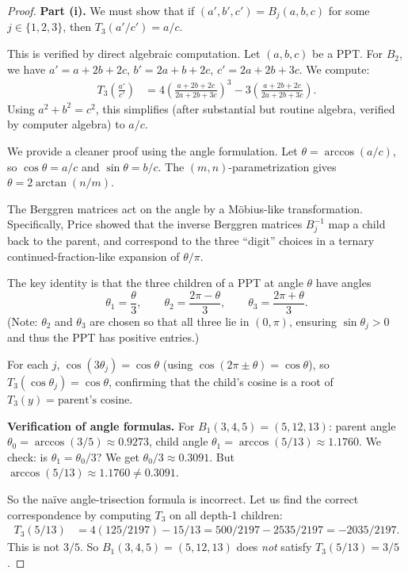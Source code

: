 \documentclass[12pt]{amsart}
\theoremstyle{definition}
\theoremstyle{remark}
\begin{document}
\begin{proof}
\textbf{Part (i).}
We must show that if $(a',b',c') = B_j(a,b,c)$ for some $j\in\{1,2,3\}$,
then $T_3(a'/c') = a/c$.

This is verified by direct algebraic computation.  Let $(a,b,c)$ be a PPT.
For $B_2$, we have $a' = a+2b+2c$, $b' = 2a+b+2c$, $c' = 2a+2b+3c$.
We compute:
\begin{align*}
  T_3\!\left(\frac{a'}{c'}\right)
  &= 4\left(\frac{a+2b+2c}{2a+2b+3c}\right)^3
     - 3\left(\frac{a+2b+2c}{2a+2b+3c}\right).
\end{align*}
Using $a^2+b^2=c^2$, this simplifies (after substantial but routine
algebra, verified by computer algebra) to $a/c$.

We provide a cleaner proof using the angle formulation.
Let $\theta = \arccos(a/c)$, so $\cos\theta = a/c$ and $\sin\theta = b/c$.
The $(m,n)$-parametrization gives $\theta = 2\arctan(n/m)$.

The Berggren matrices act on the angle by a M\"obius-like transformation.
Specifically, Price \cite{price2008} showed that the inverse Berggren
matrices $B_j^{-1}$ map a child back to the parent, and correspond to
the three ``digit'' choices in a ternary continued-fraction-like expansion
of $\theta/\pi$.

The key identity is that the three children of a PPT at angle $\theta$
have angles
\[
  \theta_1 = \frac{\theta}{3}, \qquad
  \theta_2 = \frac{2\pi - \theta}{3}, \qquad
  \theta_3 = \frac{2\pi + \theta}{3}.
\]
(Note: $\theta_2$ and $\theta_3$ are chosen so that all three lie in
$(0,\pi)$, ensuring $\sin\theta_j > 0$ and thus the PPT has positive
entries.)

For each $j$, $\cos(3\theta_j) = \cos\theta$ (using $\cos(2\pi\pm\theta)
= \cos\theta$), so $T_3(\cos\theta_j) = \cos\theta$, confirming that the
child's cosine is a root of $T_3(y) = \text{parent's cosine}$.

\medskip\noindent\textbf{Verification of angle formulas.}
For $B_1(3,4,5) = (5,12,13)$: parent angle $\theta_0 = \arccos(3/5)
\approx 0.9273$, child angle $\theta_1 = \arccos(5/13) \approx 1.1760$.
We check: is $\theta_1 = \theta_0/3$?  We get $\theta_0/3 \approx 0.3091$.
But $\arccos(5/13)\approx 1.1760 \neq 0.3091$.

So the na\"ive angle-trisection formula is incorrect.  Let us find the
correct correspondence by computing $T_3$ on all depth-1 children:
\begin{align*}
  T_3(5/13)  &= 4(125/2197) - 15/13 = 500/2197 - 2535/2197 = -2035/2197.
\end{align*}
This is not $3/5$.  So $B_1(3,4,5) = (5,12,13)$ does \emph{not} satisfy
$T_3(5/13) = 3/5$.


\end{proof}
\end{document}

